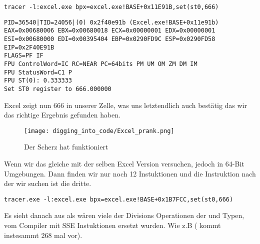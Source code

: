 \begin{lstlisting}
tracer -l:excel.exe bpx=excel.exe!BASE+0x11E91B,set(st0,666)
\end{lstlisting}

\begin{lstlisting}
PID=36540|TID=24056|(0) 0x2f40e91b (Excel.exe!BASE+0x11e91b)
EAX=0x00680006 EBX=0x00680018 ECX=0x00000001 EDX=0x00000001
ESI=0x00680000 EDI=0x00395404 EBP=0x0290FD9C ESP=0x0290FD58
EIP=0x2F40E91B
FLAGS=PF IF
FPU ControlWord=IC RC=NEAR PC=64bits PM UM OM ZM DM IM 
FPU StatusWord=C1 P 
FPU ST(0): 0.333333
Set ST0 register to 666.000000
\end{lstlisting}

Excel zeigt nun 666 in unserer Zelle, was uns letztendlich auch bestätig das wir das richtige Ergebnis gefunden haben.

\begin{figure}[H]
\centering
\texttt{[image: digging\_into\_code/Excel\_prank.png]}
\caption{Der Scherz hat funktioniert}
\end{figure}

Wenn wir das gleiche mit der selben Excel Version versuchen, jedoch in 64-Bit Umgebungen.
Dann finden wir nur noch 12 \FDIV Instuktionen und die Instruktion nach der wir suchen ist
die dritte. 

\begin{lstlisting}
tracer.exe -l:excel.exe bpx=excel.exe!BASE+0x1B7FCC,set(st0,666)
\end{lstlisting}


Es sieht danach aus als wären viele der Divisions Operationen der \Tfloat und \Tdouble Typen, vom Compiler mit SSE Instuktionen ersetzt wurden.
Wie z.B  ( kommt instesammt 268 mal vor).

